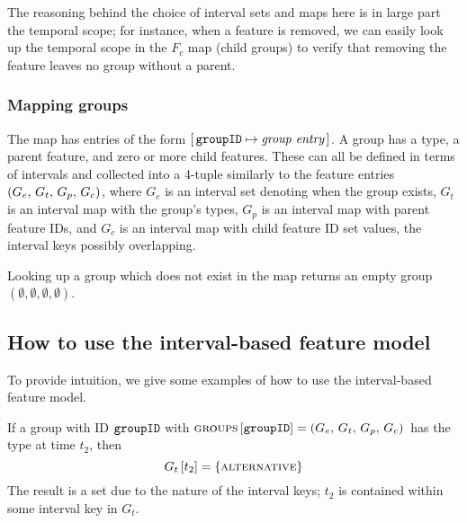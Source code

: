 The reasoning behind the choice of interval sets and maps here is in large part the temporal scope; for instance, when a feature is removed, we can easily look up the temporal scope in the $F_c$ map (child groups) to verify that removing the feature leaves no group without a parent.

\subsubsection{Mapping groups}
\label{ssub:mapping-groups}

The \groups{} map has entries of the form $[ \,\texttt{groupID} \mapsto \textit{group entry}\, ]$. A group has a type, a parent feature, and zero or more child features. These can all be defined in terms of intervals and collected into a 4-tuple similarly to the feature entries $\left(G_e,\, G_t,\, G_p,\, G_c\right)$, where $G_e$ is an interval set denoting when the group exists, $G_t$ is an interval map with the group's types, $G_p$ is an interval map with parent feature IDs, and $G_c$ is an interval map with child feature ID set values, the interval keys possibly overlapping.

Looking up a group which does not exist in the map returns an empty group $(\emptyset \comma \emptyset \comma \emptyset \comma \emptyset)$. 

\subsection{How to use the interval-based feature model}
\label{sub:how-to-use-the-interval-based-feature-model}
To provide intuition, we give some examples of how to use the interval-based feature model.

If a group with ID $\texttt{groupID}$ with $\textsc{groups}{} \left[ \texttt{groupID} \right] = \left(G_e,\, G_t,\, G_p,\, G_c\right){}$ has the type \xortype{} at time $t_2$, then
\[
  G_t \left[ t_2 \right] = \left\{\textsc{alternative}{}\right\}
\]
The result is a set due to the nature of the interval keys; $t_2$ is contained within some interval key in $G_t$. 

